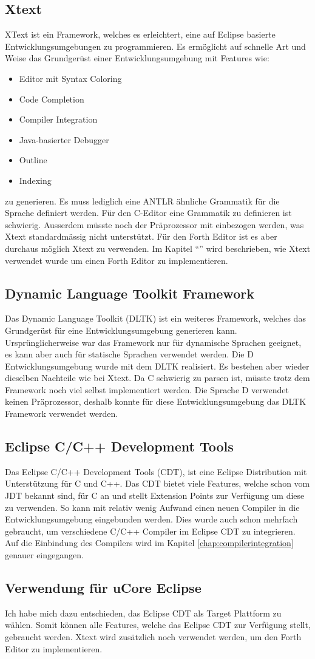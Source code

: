 \subsection{Xtext}
XText ist ein Framework, welches es erleichtert, eine auf Eclipse basierte Entwicklungsumgebungen zu programmieren. Es ermöglicht auf schnelle Art und Weise das Grundgerüst einer Entwicklungsumgebung mit Features wie:

\begin{itemize} 
	\item Editor mit Syntax Coloring
	\item Code Completion
	\item Compiler Integration
	\item Java-basierter Debugger
	\item Outline
	\item Indexing
\end{itemize}

zu generieren. \cite{xtext} Es muss lediglich eine ANTLR\cite{antlr} ähnliche Grammatik für die Sprache definiert werden. Für den C-Editor eine Grammatik zu definieren ist schwierig. Ausserdem müsste noch der Präprozessor mit einbezogen werden, was Xtext standardmässig nicht unterstützt. \newline Für den Forth Editor ist es aber durchaus möglich Xtext zu verwenden. Im Kapitel "`"' wird beschrieben, wie Xtext verwendet wurde um einen Forth Editor zu implementieren.

\subsection{Dynamic Language Toolkit Framework}
Das Dynamic Language Toolkit (DLTK) ist ein weiteres Framework, welches das Grundgerüst für eine Entwicklungsumgebung generieren kann. Ursprünglicherweise war das Framework nur für dynamische Sprachen geeignet, es kann aber auch für statische Sprachen verwendet werden. Die D Entwicklungsumgebung wurde mit dem DLTK realisiert\cite{ddt}. Es bestehen aber wieder dieselben Nachteile wie bei Xtext. Da C schwierig zu parsen ist, müsste trotz dem Framework noch viel selbst implementiert werden. Die Sprache D verwendet keinen Präprozessor, deshalb konnte für diese Entwicklungsumgebung das DLTK Framework verwendet werden.

\subsection{Eclipse C/C++ Development Tools}
Das Eclipse C/C++ Development Tools (CDT), ist eine Eclipse Distribution mit Unterstützung für C und C++. Das CDT bietet viele Features, welche schon vom JDT bekannt sind, für C an und stellt Extension Points zur Verfügung um diese zu verwenden. So kann mit relativ wenig Aufwand einen neuen Compiler in die Entwicklungsumgebung eingebunden werden. Dies wurde auch schon mehrfach gebraucht, um verschiedene C/C++ Compiler im Eclipse CDT zu integrieren. Auf die Einbindung des Compilers wird im Kapitel \ref{chap:compilerintegration} genauer eingegangen.

\subsection{Verwendung für uCore Eclipse}
Ich habe mich dazu entschieden, das Eclipse CDT als Target Plattform zu wählen. Somit können alle Features, welche das Eclipse CDT zur Verfügung stellt, gebraucht werden. Xtext wird zusätzlich noch verwendet werden, um den Forth Editor zu implementieren.
